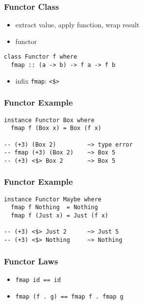 \documentclass[dvipsnames]{beamer}
\theoremstyle{plain}
\begin{document}
\begin{frame}[fragile]
  \frametitle{Functor Class}

  \begin{itemize}
    \item extract value, apply function, wrap result
    \item \alert{functor}
  \end{itemize}

  \begin{lstlisting}
class Functor f where
  fmap :: (a -> b) -> f a -> f b
  \end{lstlisting}

  \begin{itemize}
    \item infix \lstinline|fmap|: \lstinline|<$>|
  \end{itemize}
\end{frame}

\begin{frame}[fragile]
  \frametitle{Functor Example}

  \begin{lstlisting}
instance Functor Box where
  fmap f (Box x) = Box (f x)

-- (+3) (Box 2)         ~> type error
-- fmap (+3) (Box 2)    ~> Box 5
-- (+3) <$> Box 2       ~> Box 5
  \end{lstlisting}
\end{frame}

\begin{frame}[fragile]
  \frametitle{Functor Example}

  \begin{lstlisting}
instance Functor Maybe where
  fmap f Nothing  = Nothing
  fmap f (Just x) = Just (f x)

-- (+3) <$> Just 2      ~> Just 5
-- (+3) <$> Nothing     ~> Nothing
  \end{lstlisting}
\end{frame}

\begin{frame}
  \frametitle{Functor Laws}

  \begin{itemize}
    \item \lstinline|fmap id == id|

    \medskip
    \item \lstinline|fmap (f . g) == fmap f . fmap g|
  \end{itemize}
\end{frame}
\end{document}

